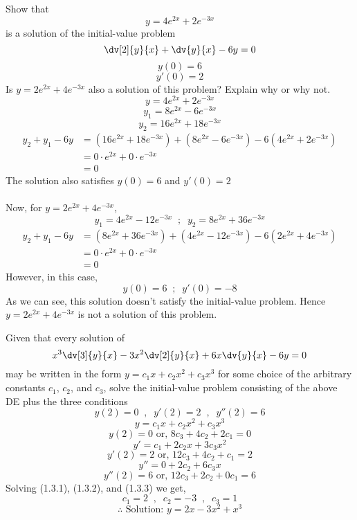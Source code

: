 \begin{example}{
        Show that \[
            y = 4e^{2x} + 2e^{-3x}
        \] is a solution of the initial-value problem \[
        \dv[2]{y}{x} + \dv{y}{x} - 6y = 0
        \] \[ y(0) = 6 \]
        \[ y'(0) = 2 \]
        Is $y=2e^{2x} + 4e^{-3x}$ also a solution of this problem? Explain why or why not.
    }{}
    \[ y = 4e^{2x} + 2e^{-3x} \]
    \[ y_1 = 8e^{2x} - 6e^{-3x} \]
    \[ y_2 = 16e^{2x} + 18e^{-3x} \]
    \begin{align*}
        y_2 + y_1 - 6y &= (16e^{2x} + 18e^{-3x}) + (8e^{2x} - 6e^{-3x}) - 6(4e^{2x} + 2e^{-3x}) \\
        &= 0\cdot e^{2x} + 0\cdot e^{-3x} \\
        &= 0
    \end{align*}
    The solution also satisfies $y(0)=6$ and  $y'(0)=2$ \\~\\

    Now,
    for $y = 2e^{2x} + 4e^{-3x}$,
    \[ y_1 = 4e^{2x} - 12e^{-3x} \;\;;\;\; y_2 = 8e^{2x} + 36e^{-3x} \]
    \begin{align*}
        y_2 + y_1 - 6y &= (8e^{2x} + 36e^{-3x}) + (4e^{2x} - 12e^{-3x}) - 6(2e^{2x} + 4e^{-3x}) \\
        &= 0\cdot e^{2x} + 0\cdot e^{-3x} \\
        &= 0
    \end{align*}
    However, in this case,
    \[ y(0) = 6 \;\;;\;\; y'(0) = -8 \]
    As we can see, this solution doesn't satisfy the initial-value problem. Hence $y=2e^{2x} + 4e^{-3x}$ is not a solution of this problem.
\end{example}

\begin{example}{
        Given that every solution of \[
            x^3 \dv[3]{y}{x} - 3x^2 \dv[2]{y}{x} + 6x \dv{y}{x} - 6y = 0
        \] may be written in the form $y = c_1x + c_2x^2 + c_3x^3$ for some choice of the arbitrary constants $c_1$, $c_2$, and $c_3$, solve the initial-value problem consisting of the above DE plus the three conditions \\
        \[ y(2)=0 \;\;,\;\; y'(2)=2 \;\;,\;\; y''(2)=6 \]
    }{}
    \[ y = c_1x + c_2x^2 + c_3x^3 \]
    \begin{equation}
        y(2) = 0 \text{ or, } 8c_3 + 4c_2 + 2c_1 = 0
    \end{equation}
    \[ y' = c_1 + 2c_2x + 3c_3x^2 \]
    \begin{equation}
        y'(2) = 2 \text{ or, } 12c_3 + 4c_2 + c_1 = 2
    \end{equation}
    \[ y'' = 0 + 2c_2 + 6c_3x \]
    \begin{equation}
        y''(2) = 6 \text{ or, } 12c_3 + 2c_2 + 0c_1 = 6
    \end{equation}
    Solving (1.3.1), (1.3.2), and (1.3.3) we get,
    \[ c_1 = 2 \;\;,\;\; c_2 = -3 \;\;,\;\; c_3 = 1 \]
    \[ \therefore \text{ Solution: } y = 2x - 3x^2 + x^3 \]
\end{example}
